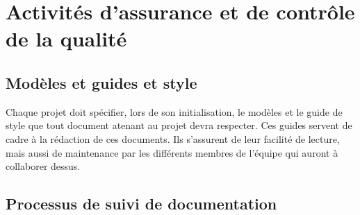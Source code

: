 \documentclass[a4paper, 18pt]{article}
\begin{document}
%
%
%
%
%
%
%
%

\section{Activités d'assurance et de contrôle de la qualité}

\subsection{Modèles et guides et style}

Chaque projet doit spécifier, lors de son initialisation, le modèles et le guide de style que tout document atenant au projet devra respecter.
Ces guides servent de cadre à la rédaction de ces documents. Ils s'assurent de leur facilité de lecture, mais aussi de maintenance par les différents membres de l'équipe qui auront à collaborer dessus.

\subsection{Processus de suivi de documentation}
\end{document}
